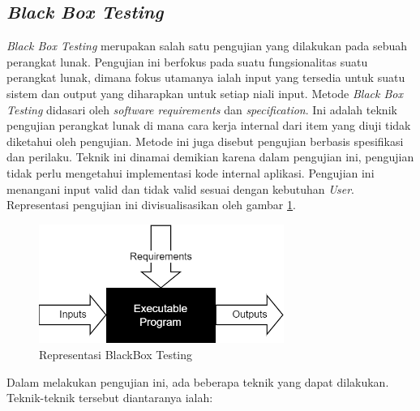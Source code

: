 \subsection{\textit{Black Box Testing}}
\textit{Black Box Testing} merupakan salah satu pengujian yang dilakukan pada sebuah perangkat lunak.
Pengujian ini berfokus pada suatu fungsionalitas suatu perangkat lunak, dimana fokus utamanya ialah input yang tersedia untuk suatu sistem dan output yang diharapkan untuk setiap niali input.
Metode \textit{Black Box Testing} didasari oleh \textit{software requirements} dan \textit{specification}. Ini adalah teknik pengujian perangkat lunak di mana cara kerja internal dari item yang diuji tidak diketahui oleh pengujian.
Metode ini juga disebut pengujian berbasis spesifikasi dan perilaku. 
Teknik ini dinamai demikian karena dalam pengujian ini, pengujian tidak perlu mengetahui implementasi kode internal aplikasi.
Pengujian ini menangani input valid dan tidak valid sesuai dengan kebutuhan \textit{User}. Representasi pengujian ini divisualisasikan oleh gambar \ref*{Fig:Black Box Testing}.
\begin{figure}[H]
	\centering
	\includegraphics[width=8cm]{contents/chapter-2/images/BlackBox-Testing.png}
	\caption[Caption]{Representasi BlackBox Testing}
	\label{Fig:Black Box Testing}
\end{figure}
Dalam melakukan pengujian ini, ada beberapa teknik yang dapat dilakukan. Teknik-teknik tersebut diantaranya ialah:
